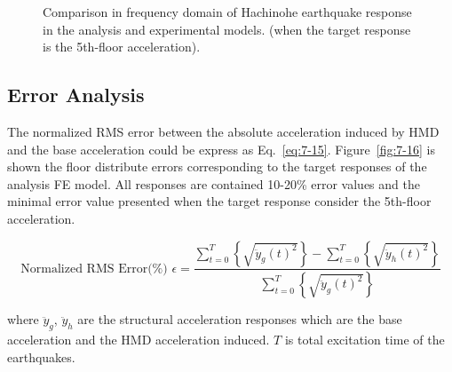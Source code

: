 \begin{figure}[!ht]
{   \label{fig:7-15e}\hfill
}
\caption{Comparison in frequency domain of Hachinohe earthquake response in the analysis and experimental models. (when the target response is the 5th-floor acceleration).}
\label{fig:7-15}
\end{figure}

\subsection{Error Analysis}

The normalized RMS error between the absolute acceleration induced by HMD and the base acceleration could be express as Eq.~\eqref{eq:7-15}. Figure~\ref{fig:7-16} is shown the floor distribute errors corresponding to the target responses of the analysis FE model. All responses are contained 10-20\% error values and the minimal error value presented when the target response consider the 5th-floor acceleration.

\begin{equation}\label{eq:7-15}
\text{Normalized RMS Error(\%) } \epsilon = \frac{\sum_{t=0}^{T}\left\{\sqrt{\ddot{y}_{g}(t)^{2}}\right\} - \sum_{t=0}^{T}\left\{\sqrt{\ddot{y}_{h}(t)^{2}}\right\}}{\sum_{t=0}^{T}\left\{\sqrt{\ddot{y}_{g}(t)^{2}}\right\}}
\end{equation}

where $\ddot{y}_{g}$, $\ddot{y}_{h}$ are the structural acceleration responses which are the base acceleration and the HMD acceleration induced. $T$ is total excitation time of the earthquakes.

